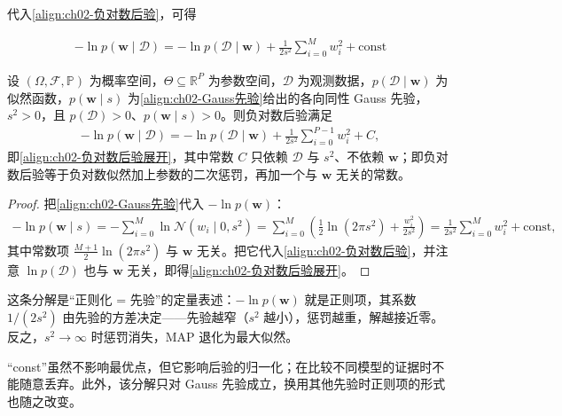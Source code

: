 \documentclass[../../main.tex]{subfiles}
\begin{document}
代入\eqref{align:ch02-负对数后验}，可得

\begin{align}
  -\ln p(\mathbf{w}\mid\mathcal{D}) = -\ln p(\mathcal{D}\mid\mathbf{w}) + \frac{1}{2s^{2}}\sum_{i=0}^{M}w_i^{2} + \text{const}
  \label{align:ch02-负对数后验展开}
\end{align}

\begin{proposition}[负对数后验的分解]\label{proposition:ch02-负对数后验分解}
设 $(\Omega,\mathcal{F},\mathbb{P})$ 为概率空间，$\Theta\subseteq\mathbb{R}^{P}$ 为参数空间，$\mathcal{D}$ 为观测数据，$p(\mathcal{D}\mid\mathbf{w})$ 为似然函数，$p(\mathbf{w}\mid s)$ 为\eqref{align:ch02-Gauss先验}给出的各向同性 Gauss 先验，$s^{2}>0$，且 $p(\mathcal{D})>0$、$p(\mathbf{w}\mid s)>0$。则负对数后验满足
\begin{align*}
  -\ln p(\mathbf{w}\mid\mathcal{D})=-\ln p(\mathcal{D}\mid\mathbf{w})+\frac{1}{2s^{2}}\sum_{i=0}^{P-1}w_i^{2}+C,
\end{align*}
即\eqref{align:ch02-负对数后验展开}，其中常数 $C$ 只依赖 $\mathcal{D}$ 与 $s^{2}$、不依赖 $\mathbf{w}$；即负对数后验等于负对数似然加上参数的二次惩罚，再加一个与 $\mathbf{w}$ 无关的常数。
\end{proposition}

\begin{proof}
把\eqref{align:ch02-Gauss先验}代入 $-\ln p(\mathbf{w})$：
\begin{align*}
  -\ln p(\mathbf{w}\mid s) = -\sum_{i=0}^{M}\ln\mathcal{N}(w_i\mid0,s^{2})
  = \sum_{i=0}^{M}\left(\frac{1}{2}\ln(2\pi s^{2}) + \frac{w_i^{2}}{2s^{2}}\right)
  = \frac{1}{2s^{2}}\sum_{i=0}^{M}w_i^{2} + \text{const} ,
\end{align*}
其中常数项 $\frac{M+1}{2}\ln(2\pi s^{2})$ 与 $\mathbf{w}$ 无关。把它代入\eqref{align:ch02-负对数后验}，并注意 $\ln p(\mathcal{D})$ 也与 $\mathbf{w}$ 无关，即得\eqref{align:ch02-负对数后验展开}。
\end{proof}

\begin{remark}
这条分解是“正则化 = 先验”的定量表述：$-\ln p(\mathbf{w})$ 就是正则项，其系数 $1/(2s^{2})$ 由先验的方差决定——先验越窄（$s^{2}$ 越小），惩罚越重，解越接近零。反之，$s^{2}\to\infty$ 时惩罚消失，MAP 退化为最大似然。

“const”虽然不影响最优点，但它影响后验的归一化；在比较不同模型的证据时不能随意丢弃。此外，该分解只对 Gauss 先验成立，换用其他先验时正则项的形式也随之改变。
\end{remark}
\end{document}
